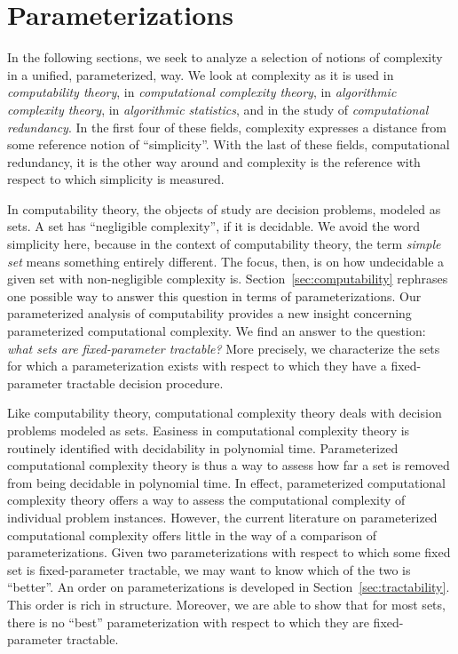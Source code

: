 \chapter{Parameterizations}
\label{ch:parameterizations}%


In the following sections, we seek to analyze a selection of notions of complexity in a unified, parameterized, way.
We look at complexity as it is used in \emph{computability theory}, in \emph{computational complexity theory}, in \emph{algorithmic complexity theory}, in \emph{algorithmic statistics}, and in the study of \emph{computational redundancy}.
In the first four of these fields, complexity expresses a distance from some reference notion of \enquote{simplicity}.
With the last of these fields, computational redundancy, it is the other way around and complexity is the reference with respect to which simplicity is measured.

In computability theory, the objects of study are decision problems, modeled as sets.
A set has \enquote{negligible complexity}, if it is decidable.
We avoid the word simplicity here, because in the context of computability theory, the term \emph{simple set} means something entirely different.
The focus, then, is on how undecidable a given set with non-negligible complexity is.
Section~\ref{sec:computability} rephrases one possible way to answer this question in terms of parameterizations.
Our parameterized analysis of computability provides a new insight concerning parameterized computational complexity.
We find an answer to the question: \emph{what sets are fixed-parameter tractable?}
More precisely, we characterize the sets for which a parameterization exists with respect to which they have a fixed-parameter tractable decision procedure.

Like computability theory, computational complexity theory deals with decision problems modeled as sets.
Easiness in computational complexity theory is routinely identified with decidability in polynomial time.
Parameterized computational complexity theory is thus a way to assess how far a set is removed from being decidable in polynomial time.
In effect, parameterized computational complexity theory offers a way to assess the computational complexity of individual problem instances.
However, the current literature on parameterized computational complexity offers little in the way of a comparison of parameterizations.
Given two parameterizations with respect to which some fixed set is fixed-parameter tractable, we may want to know which of the two is \enquote{better}.
An order on parameterizations is developed in Section~\ref{sec:tractability}.
This order is rich in structure.
Moreover, we are able to show that for most sets, there is no \enquote{best} parameterization with respect to which they are fixed-parameter tractable.

